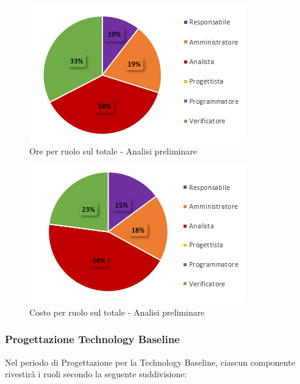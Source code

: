 \begin{figure}[H]
  \centering
  \includegraphics[scale=1]{immagini/ore_ruolo_analisi.png}
  \caption{Ore per ruolo sul totale - Analisi preliminare}
\end{figure}

\begin{figure}[H]
  \centering
  \includegraphics[scale=1]{immagini/costo_ruolo_analisi.png}
  \caption{Costo per ruolo sul totale - Analisi preliminare}
\end{figure}


\subsubsection{Progettazione Technology Baseline}
Nel periodo di Progettazione per la Technology Baseline, ciascun componente rivestirà i ruoli secondo la seguente suddivisione:

